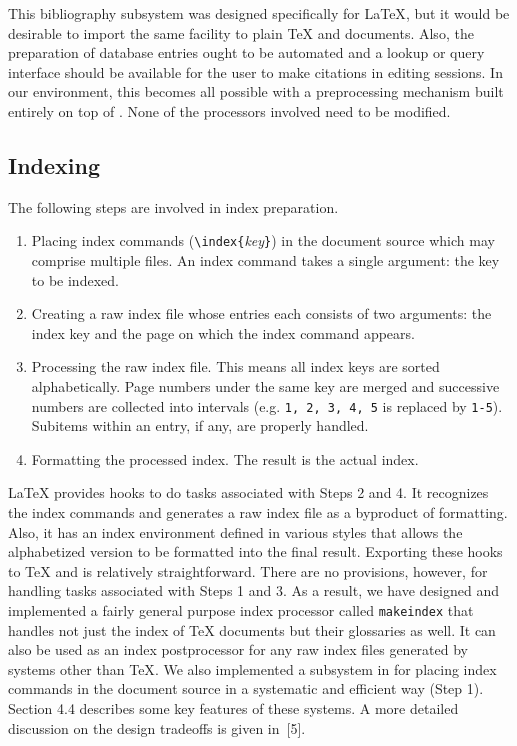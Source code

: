 This bibliography subsystem was designed specifically for {\LaTeX}, but it
would be desirable to import the same facility to plain {\TeX} and
{\AmSTeX} documents.  Also, the preparation of database entries ought to be
automated and a lookup or query interface should be available for the user
to make citations in editing sessions.  In our environment,
this becomes all possible with a preprocessing
mechanism built entirely on top of {\emacs}.  None of the processors involved
need to be modified.

\subsection{Indexing}
The following steps are involved in index preparation.
\begin{enumerate}
  \item Placing index commands (\verb|\index{|{\it key\/}\verb|}|)
	in the document source which may
	comprise multiple files.  An index command takes a single
	argument: the key to be indexed.
  \item Creating a raw index file whose entries each consists
	of two arguments: the index key and the page on which the index
	command appears.
  \item Processing the raw index file.  This means all index keys are
	sorted alphabetically.  Page numbers under the same key are merged
	and successive numbers are collected into
	intervals (e.g. \verb|1, 2, 3, 4, 5| is replaced by \verb|1-5|).
	Subitems within an entry, if any, are properly handled.
  \item Formatting the processed index.  The result is the actual index.
\end{enumerate}

{\LaTeX} provides hooks to do tasks associated with Steps 2 and 4.
It recognizes the index commands and
generates a raw index file as a byproduct of formatting.
Also, it has an index environment defined in various styles that
allows the alphabetized version to be formatted into the final result.
Exporting these hooks to {\TeX} and {\AmSTeX} is relatively straightforward.
There are no provisions, however,
for handling tasks associated with Steps 1 and 3.
As a result, we have designed and implemented 
a fairly general purpose index processor called \verb|makeindex| 
that handles not just
the index of {\TeX} documents but their glossaries as well.
It can also be used as an index postprocessor for any raw index files generated
by systems other than {\TeX}.
We also implemented a subsystem in {\TM} for placing index commands
in the document source in a systematic and efficient way (Step 1).
Section 4.4 describes some key features of these systems.
A more detailed discussion on the design tradeoffs is given in~[5].


